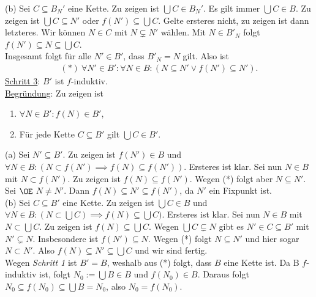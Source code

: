 \documentclass[../../main.tex]{subfiles}
\begin{document}
\begin{cproof}
\noindent(b) Sei $C\subseteq B_N'$ eine Kette. Zu zeigen ist $\bigcup C\in B_N'$. Es gilt immer $\bigcup C\in B$. Zu zeigen ist $\bigcup C\subseteq N'$ oder $f(N')\subseteq \bigcup C$. Gelte ersteres nicht, zu zeigen ist dann letzteres. Wir können $N\in C$ mit $N\subsetneq N'$ wählen. Mit $N\in B'_N$ folgt $f(N')\subseteq N\subseteq \bigcup C$.\\
					
\noindent Insgesamt folgt für alle $N'\in B'$, dass $B'_N=N$ gilt. Also ist
\begin{align*}
(*)\ \forall N'\in B': \forall N\in B: (N\subseteq N'\lor f(N')\subseteq N').
\end{align*}
\noindent\underline{Schritt 3}: $B'$ ist $f$-induktiv.\\
\noindent\underline{Begründung}: Zu zeigen ist 
\begin{enumerate}[\normalfont(a)]
\item $\forall N\in B': f(N)\in B'$,
\item Für jede Kette $C\subseteq B'$ gilt $\bigcup C\in B'$.
\end{enumerate}
(a) Sei $N'\subseteq B'$. Zu zeigen ist $f(N')\in B$ und $\forall N\in B: (N\subset f(N')\implies f(N)\subseteq f(N'))$. Ersteres ist klar. Sei nun $N\in B$ mit $N\subset f(N')$. Zu zeigen ist $f(N)\subseteq f(N')$. Wegen (*) folgt aber $N\subseteq N'$. Sei $\OE$ $N\neq N'$. Dann $f(N)\subseteq N'\subseteq f(N')$, da $N'$ ein Fixpunkt ist.\\
					
\noindent(b) Sei $C\subseteq B'$ eine Kette. Zu zeigen ist $\bigcup C\in B$ und $\forall N\in B: (N\subset \bigcup C)\implies f(N)\subseteq \bigcup C)$. Ersteres ist klar. Sei nun $N\in B$ mit $N\subset \bigcup C$. Zu zeigen ist $f(N)\subseteq \bigcup C$. Wegen $\bigcup C\subsetneq N$ gibt es $N'\in C\subseteq B'$ mit $N'\subsetneq N$. Insbesondere ist $f(N')\subseteq N$. Wegen (*) folgt $N\subseteq N'$ und hier sogar $N\subset N'$. Also $f(N)\subseteq N'\subseteq \bigcup C$ und wir sind fertig. \\
					
\noindent Wegen \textit{Schritt 1} ist $B'=B$, weshalb aus (*) folgt, dass $B$ eine Kette ist. Da B $f$-induktiv ist, folgt $N_0:=\bigcup B\in B$ und $f(N_0)\in B$. Daraus folgt $N_0\subseteq f(N_0)\subseteq \bigcup B=N_0$, also $N_0=f(N_0)$.
\end{cproof}
\end{document}
